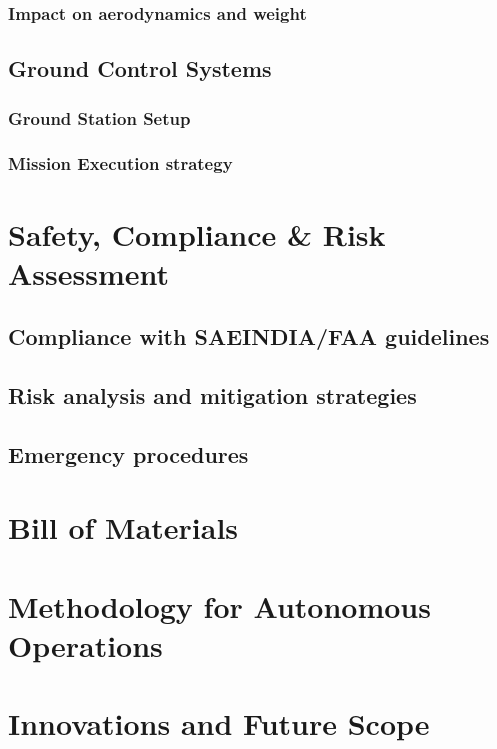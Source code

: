 \documentclass[12pt]{report}
\begin{document}
      \subsection{Impact on aerodynamics and weight}

    \section{Ground Control Systems}
      \subsection{Ground Station Setup}
      \subsection{Mission Execution strategy}

  \chapter{Safety, Compliance \& Risk Assessment}
    \section{Compliance with SAEINDIA/FAA guidelines}
    \section{Risk analysis and mitigation strategies}
    \section{Emergency procedures}
  
  \chapter{Bill of Materials}
  \chapter{Methodology for Autonomous Operations}
  \chapter{Innovations and Future Scope}
  
\end{document}
